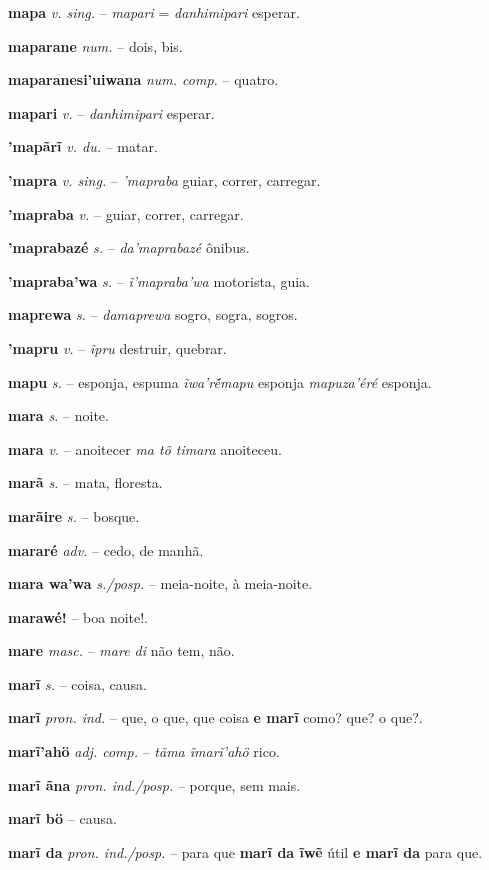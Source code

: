 \textbf{mapa} \textit{v. sing.} -- \textit{mapari} = \textit{danhimipari} esperar.

\textbf{maparane} \textit{num.} -- dois, bis.

\textbf{maparanesi'uiwana} \textit{num. comp.} -- quatro.

\textbf{mapari} \textit{v.} -- \textit{danhimipari} esperar.

\textbf{'mapãrĩ} \textit{v. du.} -- matar.

\textbf{'mapra} \textit{v. sing.} -- \textit{'mapraba} guiar, correr, carregar.

\textbf{'mapraba} \textit{v.} -- guiar, correr, carregar.

\textbf{'maprabazé} \textit{s.} -- \textit{da'maprabazé} ônibus.

\textbf{'mapraba'wa} \textit{s.} -- \textit{ĩ'mapraba'wa} motorista, guia.

\textbf{maprewa} \textit{s.} -- \textit{damaprewa} sogro, sogra, sogros.

\textbf{'mapru} \textit{v.} -- \textit{ĩpru} destruir, quebrar.

\textbf{mapu} \textit{s.} -- esponja, espuma  \textit{ĩwa'ré̃mapu} esponja  \textit{mapuza'éré} esponja.

\textbf{mara} \textit{s.} -- noite.

\textbf{mara} \textit{v.} -- anoitecer  \textit{ma tõ timara} anoiteceu.

\textbf{marã} \textit{s.} -- mata, floresta.

\textbf{marãire} \textit{s.} -- bosque.

\textbf{mararé} \textit{adv.} -- cedo, de manhã.

\textbf{mara wa'wa} \textit{s./posp.} -- meia-noite, à meia-noite.

\textbf{marawé!} -- boa noite!.

\textbf{mare} \textit{masc.} -- \textit{mare di} não tem, não.

\textbf{marĩ} \textit{s.} -- coisa, causa.

\textbf{marĩ} \textit{pron. ind.} -- que, o que, que coisa  \textbf{e marĩ} como? que? o que?.

\textbf{marĩ'ahö} \textit{adj. comp.} -- \textit{tãma ĩmarĩ'ahö} rico.

\textbf{marĩ ãna} \textit{pron. ind./posp.} -- porque, sem mais.

\textbf{marĩ bö} -- causa.

\textbf{marĩ da} \textit{pron. ind./posp.} -- para que  \textbf{marĩ da ĩwẽ} útil  \textbf{e marĩ da} para que.

